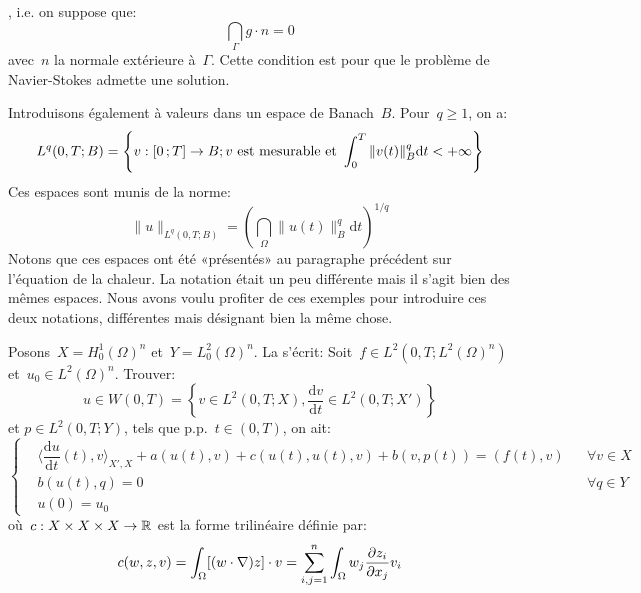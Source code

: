 , i.e. on suppose que:
\begin{equation}
\dint_\Gamma g\cdot n %
= 0
\end{equation}
avec~$n$ la normale extérieure à~$\Gamma$. Cette condition est  pour que le problème de Navier-Stokes admette une solution.

\medskip
Introduisons également  à valeurs dans un espace
de Banach~$B$. Pour~$q\ge1$, on a:
\begin{equation}
L^q(0,T;B) =\left\{ v: \mathopen{[}0\,;T\mathclose{]}\rightarrow B; v \text{ est mesurable et }
\displaystyle\int_0^T \|v(t)\|^q_B \mathrm dt<+\infty\right\}
\end{equation}
Ces espaces sont munis de la norme:
\begin{equation}
\|u\|_{L^q(0,T;B)} = \left(\dint_\Omega\|u(t)\|^q_B \mathrm dt\right)^{1/q}
\end{equation}
Notons que ces espaces ont été «présentés» au paragraphe précédent sur l'équation de la chaleur. La notation était un peu différente mais il s'agit bien des mêmes espaces. Nous avons voulu profiter de ces exemples pour introduire ces deux notations, différentes mais désignant bien la même chose.

\medskip
Posons~$X=H^1_0(\Omega)^n$ et~$Y=L^2_0(\Omega)^n$.
\medskip
La  s'écrit: Soit~$f\in L^2(0,T;L^2(\Omega)^n)$ et~$u_0\in L^2(\Omega)^n$.
Trouver:
\begin{equation}u\in W(0,T)=\left\{v\in L^2(0,T;X), \dfrac{\mathrm dv}{\mathrm dt}\in L^2(0,T;X') \right\}\end{equation} et
$p\in L^2(0,T;Y)$, tels que p.p.~$t\in(0,T)$, on ait:
\begin{equation}\left\{
\begin{aligned}
&\langle\dfrac{\mathrm du}{\mathrm dt}(t),v\rangle_{X',X}+a(u(t),v)+c(u(t),u(t),v)+b(v,p(t)) = (f(t),v) &&
\forall v\in X\\
&b(u(t),q) =0 &&\forall q \in Y\\
&u(0)=u_0
\end{aligned}\right.
\end{equation}
où~$c: X\times X\times X\rightarrow\mathbb R$ est la forme trilinéaire définie par:
\begin{equation}
c(w,z,v) = \dint_\Omega [(w\cdot\nabla)z]\cdot v %
=\dsum_{i,j=1}^n \dint_\Omega w_j\dfrac{\partial z_i}{\partial x_j} v_i %
\end{equation}

